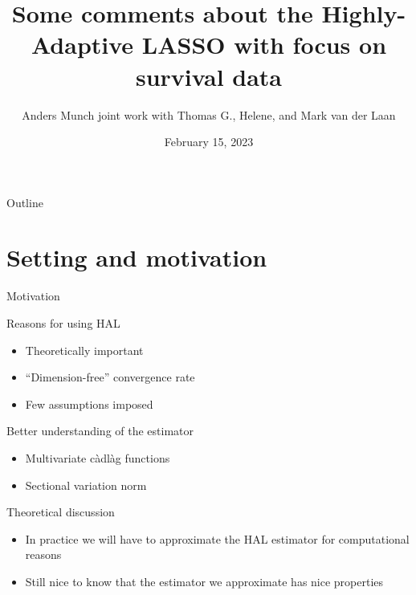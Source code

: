 \documentclass[smaller]{beamer}\usepackage{listings}
\author{Anders Munch \newline \small joint work with Thomas G., Helene, and Mark van der Laan}
\date{February 15, 2023}
\title{Some comments about the Highly-Adaptive LASSO with focus on survival data}
\begin{document}
\maketitle
\begin{frame}{Outline}
\tableofcontents
\end{frame}

\section{Setting and motivation}
\label{sec:org6487cad}
\begin{frame}[label={sec:org41966fe}]{Motivation}
\small
\begin{block}{Reasons for using HAL}
\begin{itemize}
\item Theoretically important
\item ``Dimension-free'' convergence rate
\item Few assumptions imposed
\end{itemize}

\pause  
\end{block}

\begin{block}{Better understanding of the estimator}
\begin{itemize}
\item Multivariate càdlàg functions
\item Sectional variation norm
\end{itemize}

\pause
\end{block}

\begin{block}{Theoretical discussion}
\begin{itemize}
\item In practice we will have to approximate the HAL estimator for computational
reasons
\item Still nice to know that the estimator we approximate has  nice properties
\end{itemize}
\end{block}
\end{frame}
\end{document}

